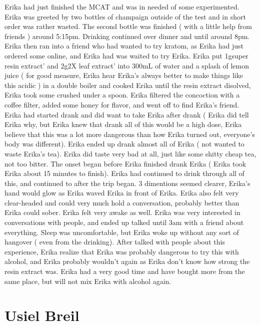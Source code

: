 \documentclass[12pt]{book}
\begin{document}
Erika had just finished the MCAT and was in needed of some experimented. Erika was greeted by two bottles of champaign outside of the test and in short order was rather wasted. The second bottle was finished ( with a little help from friends ) around 5:15pm. Drinking continued over dinner and until around 8pm. Erika then ran into a friend who had wanted to try kratom, as Erika had just ordered some online, and Erika had was waited to try Erika. Erika put 1gsuper resin extract' and 2g2X leaf extract' into 300mL of water and a splash of lemon juice ( for good measure, Erika hear Erika's always better to make things like this acidic ) in a double boiler and cooked Erika until the resin extract disolved, Erika took some crushed under a spoon. Erika filtered the concoction with a coffee filter, added some honey for flavor, and went off to find Erika's friend. Erika had started drank and did want to take Erika after drank ( Erika did tell Erika why, but Erika knew that drank all of this would be a high dose, Erika believe that this was a lot more dangerous than how Erika turned out, everyone's body was different). Erika ended up drank almost all of Erika ( not wanted to waste Erika's tea). Erika did taste very bad at all, just like some shitty cheap tea, not too bitter. The onset began before Erika finished drank Erika ( Erika took Erika about 15 minutes to finish). Erika had continued to drink through all of this, and continued to after the trip began. 3 dimentions seemed clearer, Erika's hand would glow as Erika waved Erika in front of Erika. Erika also felt very clear-headed and could very much hold a conversation, probably better than Erika could sober. Erika felt very awake as well. Erika was very interested in conversations with people, and ended up talked until 3am with a friend about everything. Sleep was uncomfortable, but Erika woke up without any sort of hangover ( even from the drinking). After talked with people about this experience, Erika realize that Erika was probably dangerous to try this with alcohol, and Erika probably wouldn't again as Erika don't know how strong the resin extract was. Erika had a very good time and have bought more from the same place, but will not mix Erika with alcohol again.



\chapter{Usiel Breil}
\end{document}
